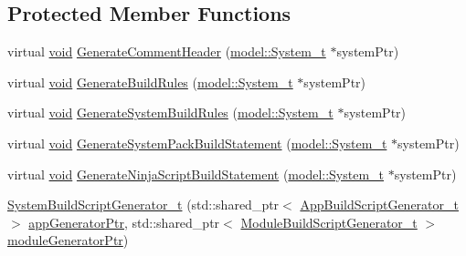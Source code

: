 \subsection*{Protected Member Functions}
\begin{DoxyCompactItemize}
\item 
virtual \hyperlink{_t_e_m_p_l_a_t_e__cdef_8h_ac9c84fa68bbad002983e35ce3663c686}{void} \hyperlink{classninja_1_1_system_build_script_generator__t_a04a55b498b61f0bf0a400ad0fb64c3a5}{Generate\+Comment\+Header} (\hyperlink{structmodel_1_1_system__t}{model\+::\+System\+\_\+t} $\ast$system\+Ptr)
\item 
virtual \hyperlink{_t_e_m_p_l_a_t_e__cdef_8h_ac9c84fa68bbad002983e35ce3663c686}{void} \hyperlink{classninja_1_1_system_build_script_generator__t_a22344ca75d54e71bb2851ebf55fdda48}{Generate\+Build\+Rules} (\hyperlink{structmodel_1_1_system__t}{model\+::\+System\+\_\+t} $\ast$system\+Ptr)
\item 
virtual \hyperlink{_t_e_m_p_l_a_t_e__cdef_8h_ac9c84fa68bbad002983e35ce3663c686}{void} \hyperlink{classninja_1_1_system_build_script_generator__t_af74bb247346ba4039544445632ca7fee}{Generate\+System\+Build\+Rules} (\hyperlink{structmodel_1_1_system__t}{model\+::\+System\+\_\+t} $\ast$system\+Ptr)
\item 
virtual \hyperlink{_t_e_m_p_l_a_t_e__cdef_8h_ac9c84fa68bbad002983e35ce3663c686}{void} \hyperlink{classninja_1_1_system_build_script_generator__t_acd3e4ea0e0d0973c84578ed9acb939f7}{Generate\+System\+Pack\+Build\+Statement} (\hyperlink{structmodel_1_1_system__t}{model\+::\+System\+\_\+t} $\ast$system\+Ptr)
\item 
virtual \hyperlink{_t_e_m_p_l_a_t_e__cdef_8h_ac9c84fa68bbad002983e35ce3663c686}{void} \hyperlink{classninja_1_1_system_build_script_generator__t_aa8864cf266d3a6ea2eb0943d7ecb5ac9}{Generate\+Ninja\+Script\+Build\+Statement} (\hyperlink{structmodel_1_1_system__t}{model\+::\+System\+\_\+t} $\ast$system\+Ptr)
\item 
\hyperlink{classninja_1_1_system_build_script_generator__t_a6558d19831acd12dffdc5102293f9625}{System\+Build\+Script\+Generator\+\_\+t} (std\+::shared\+\_\+ptr$<$ \hyperlink{classninja_1_1_app_build_script_generator__t}{App\+Build\+Script\+Generator\+\_\+t} $>$ \hyperlink{structninja_1_1_require_app_generator__t_ad4d8afe12062be89a150f6ef7098014b}{app\+Generator\+Ptr}, std\+::shared\+\_\+ptr$<$ \hyperlink{classninja_1_1_module_build_script_generator__t}{Module\+Build\+Script\+Generator\+\_\+t} $>$ \hyperlink{structninja_1_1_require_module_generator__t_a4c8d24c29079a31a7050e080ac48b55b}{module\+Generator\+Ptr})
\end{DoxyCompactItemize}
